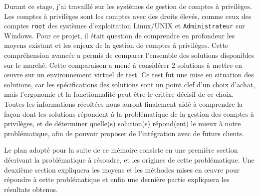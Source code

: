 Durant ce stage, j'ai travaillé sur les systèmes de gestion de comptes à privilèges.
Les comptes à privilèges sont les comptes avec des droits élevés, comme ceux des comptes \texttt{root} des systèmes d'exploitation Linux/UNIX et \texttt{Administrateur} sur Windows.
Pour ce projet, il était question de comprendre en profondeur les moyens existant et les enjeux de la gestion de comptes à privilèges.
Cette compréhension avancée a permis de comparer l'ensemble des solutions disponibles sur le marché.
Cette comparaison a mené à considérer 2 solutions à mettre en œuvre sur un environnement virtuel de test.
Ce test fut une mise en situation des solutions, car les spécifications des solutions sont un point clef d'un choix d'achat, mais l'ergonomie et la fonctionnalité peut être le critère décisif de ce choix.
Toutes les informations récoltées nous auront finalement aidé à comprendre la façon dont les solutions répondent à la problématique de la gestion des comptes à privilèges, et de déterminer quelle(s) solution(s) répond(ent) le mieux à notre problématique, afin de pouvoir proposer de l'intégration avec de futurs clients.

Le plan adopté pour la suite de ce mémoire consiste en une première section décrivant la problématique à résoudre, et les origines de cette problématique. Une deuxième section expliquera les moyens et les méthodes mises en œuvre pour répondre à cette problématique et enfin une dernière partie expliquera les résultats obtenus.
